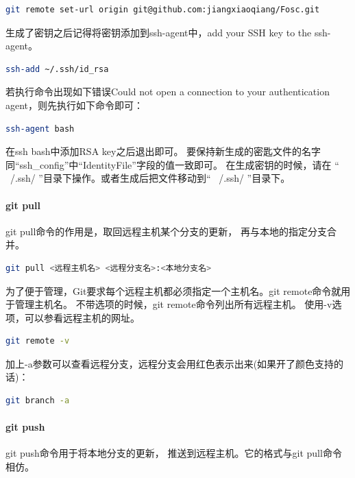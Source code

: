 \documentclass{book}
\begin{document}
\begin{lstlisting}[language=Bash]
git remote set-url origin git@github.com:jiangxiaoqiang/Fosc.git
\end{lstlisting}

生成了密钥之后记得将密钥添加到ssh-agent中，add your SSH key to the ssh-agent。

\begin{lstlisting}[language=Bash]
ssh-add ~/.ssh/id_rsa
\end{lstlisting}

若执行命令出现如下错误Could not open a connection to your authentication agent，则先执行如下命令即可：

\begin{lstlisting}[language=Bash]
ssh-agent bash
\end{lstlisting}

在ssh bash中添加RSA key之后退出即可。
要保持新生成的密匙文件的名字同“ssh\_config”中“IdentityFile”字段的值一致即可。
在生成密钥的时候，请在 “ ~/.ssh/ ”目录下操作。或者生成后把文件移动到“ ~/.ssh/ ”目录下。

\paragraph{git pull}git pull命令的作用是，取回远程主机某个分支的更新，
再与本地的指定分支合并。

\begin{lstlisting}[language=Bash]
git pull <远程主机名> <远程分支名>:<本地分支名>
\end{lstlisting}


为了便于管理，Git要求每个远程主机都必须指定一个主机名。git remote命令就用于管理主机名。
不带选项的时候，git remote命令列出所有远程主机。
使用-v选项，可以参看远程主机的网址。

\begin{lstlisting}[language=Bash]
git remote -v
\end{lstlisting}

加上-a参数可以查看远程分支，远程分支会用红色表示出来(如果开了颜色支持的话)：

\begin{lstlisting}[language=Bash]
git branch -a
\end{lstlisting}

\paragraph{git push}git push命令用于将本地分支的更新，
推送到远程主机。它的格式与git pull命令相仿。
\end{document}
